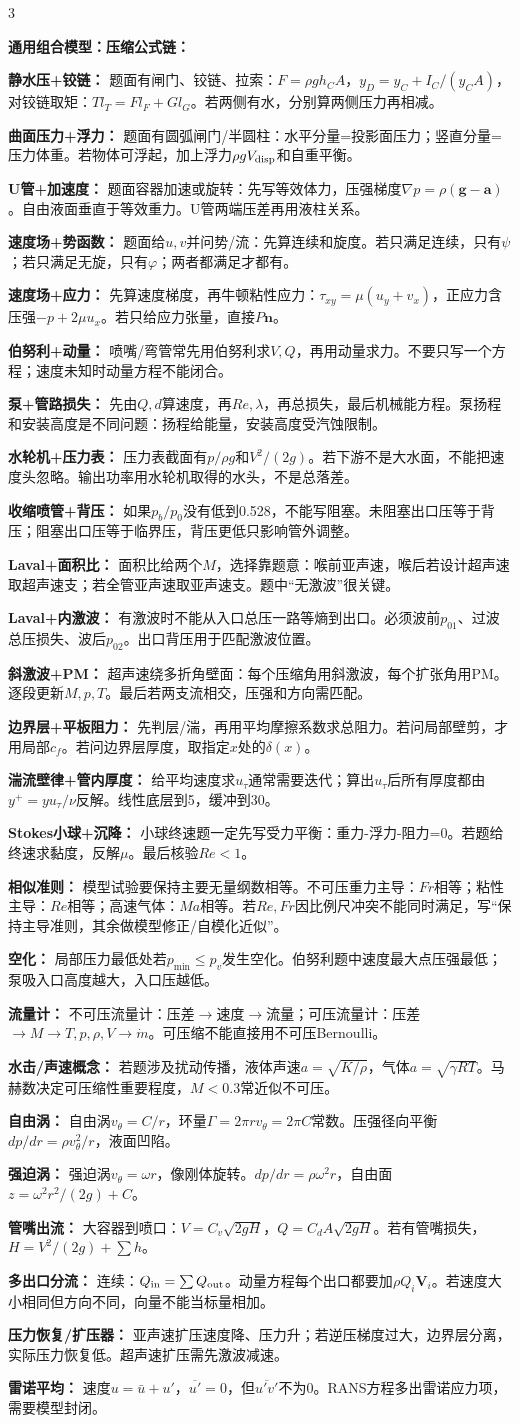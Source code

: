 \documentclass[a4paper]{article}
\newcommand{\sect}[1]{\par{\bfseries\color{Q}#1：}}
\begin{document}
\begin{multicols}{3}
{\sect{通用组合模型：压缩公式链}
\sect{静水压+铰链}
题面有闸门、铰链、拉索：$F=\rho gh_CA$，$y_D=y_C+I_C/(y_CA)$，对铰链取矩：$T l_T=F l_F+G l_G$。若两侧有水，分别算两侧压力再相减。
\sect{曲面压力+浮力}
题面有圆弧闸门/半圆柱：水平分量=投影面压力；竖直分量=压力体重。若物体可浮起，加上浮力$\rho gV_{\rm disp}$和自重平衡。
\sect{U管+加速度}
题面容器加速或旋转：先写等效体力，压强梯度$\nabla p=\rho(\bm g-\bm a)$。自由液面垂直于等效重力。U管两端压差再用液柱关系。
\sect{速度场+势函数}
题面给$u,v$并问势/流：先算连续和旋度。若只满足连续，只有$\psi$；若只满足无旋，只有$\varphi$；两者都满足才都有。
\sect{速度场+应力}
先算速度梯度，再牛顿粘性应力：$\tau_{xy}=\mu(u_y+v_x)$，正应力含压强$-p+2\mu u_x$。若只给应力张量，直接$P\bm n$。
\sect{伯努利+动量}
喷嘴/弯管常先用伯努利求$V,Q$，再用动量求力。不要只写一个方程；速度未知时动量方程不能闭合。
\sect{泵+管路损失}
先由$Q,d$算速度，再$Re,\lambda$，再总损失，最后机械能方程。泵扬程和安装高度是不同问题：扬程给能量，安装高度受汽蚀限制。
\sect{水轮机+压力表}
压力表截面有$p/\rho g$和$V^2/(2g)$。若下游不是大水面，不能把速度头忽略。输出功率用水轮机取得的水头，不是总落差。
\sect{收缩喷管+背压}
如果$p_b/p_0$没有低到0.528，不能写阻塞。未阻塞出口压等于背压；阻塞出口压等于临界压，背压更低只影响管外调整。
\sect{Laval+面积比}
面积比给两个$M$，选择靠题意：喉前亚声速，喉后若设计超声速取超声速支；若全管亚声速取亚声速支。题中“无激波”很关键。
\sect{Laval+内激波}
有激波时不能从入口总压一路等熵到出口。必须波前$p_{01}$、过波总压损失、波后$p_{02}$。出口背压用于匹配激波位置。
\sect{斜激波+PM}
超声速绕多折角壁面：每个压缩角用斜激波，每个扩张角用PM。逐段更新$M,p,T$。最后若两支流相交，压强和方向需匹配。
\sect{边界层+平板阻力}
先判层/湍，再用平均摩擦系数求总阻力。若问局部壁剪，才用局部$c_f$。若问边界层厚度，取指定$x$处的$\delta(x)$。
\sect{湍流壁律+管内厚度}
给平均速度求$u_\tau$通常需要迭代；算出$u_\tau$后所有厚度都由$y^+=yu_\tau/\nu$反解。线性底层到5，缓冲到30。
\sect{Stokes小球+沉降}
小球终速题一定先写受力平衡：重力-浮力-阻力=0。若题给终速求黏度，反解$\mu$。最后核验$Re<1$。
\sect{相似准则}
模型试验要保持主要无量纲数相等。不可压重力主导：$Fr$相等；粘性主导：$Re$相等；高速气体：$Ma$相等。若$Re,Fr$因比例尺冲突不能同时满足，写“保持主导准则，其余做模型修正/自模化近似”。
\sect{空化}
局部压力最低处若$p_{\min}\le p_v$发生空化。伯努利题中速度最大点压强最低；泵吸入口高度越大，入口压越低。
\sect{流量计}
不可压流量计：压差$\to$速度$\to$流量；可压流量计：压差$\to M\to T,p,\rho,V\to \dot m$。可压缩不能直接用不可压Bernoulli。
\sect{水击/声速概念}
若题涉及扰动传播，液体声速$a=\sqrt{K/\rho}$，气体$a=\sqrt{\gamma RT}$。马赫数决定可压缩性重要程度，$M<0.3$常近似不可压。
\sect{自由涡}
自由涡$v_\theta=C/r$，环量$\Gamma=2\pi r v_\theta=2\pi C$常数。压强径向平衡$dp/dr=\rho v_\theta^2/r$，液面凹陷。
\sect{强迫涡}
强迫涡$v_\theta=\omega r$，像刚体旋转。$dp/dr=\rho\omega^2r$，自由面$z=\omega^2r^2/(2g)+C$。
\sect{管嘴出流}
大容器到喷口：$V=C_v\sqrt{2gH}$，$Q=C_dA\sqrt{2gH}$。若有管嘴损失，$H=V^2/(2g)+\sum h$。
\sect{多出口分流}
连续：$Q_{\rm in}=\sum Q_{\rm out}$。动量方程每个出口都要加$\rho Q_i\bm V_i$。若速度大小相同但方向不同，向量不能当标量相加。
\sect{压力恢复/扩压器}
亚声速扩压速度降、压力升；若逆压梯度过大，边界层分离，实际压力恢复低。超声速扩压需先激波减速。
\sect{雷诺平均}
速度$u=\bar u+u'$，$\overline{u'}=0$，但$\overline{u'v'}$不为0。RANS方程多出雷诺应力项，需要模型封闭。

}
\end{multicols}
\end{document}
